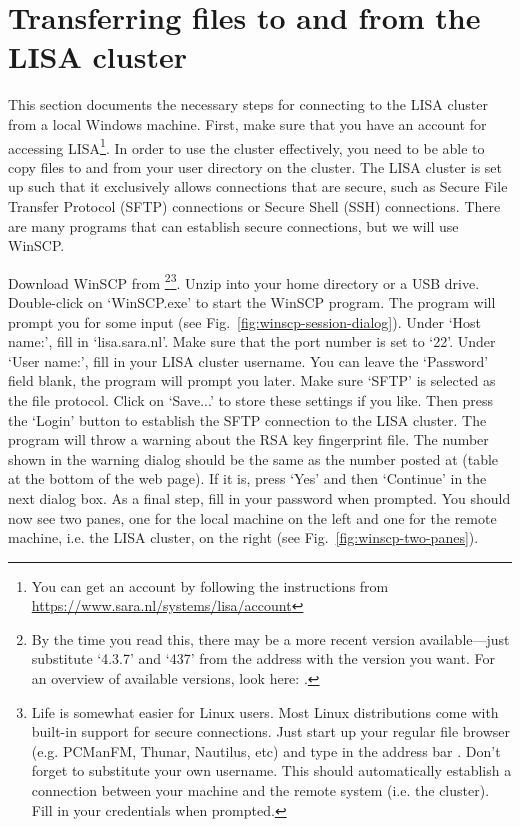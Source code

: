 \section{Transferring files to and from the LISA cluster}

This section documents the necessary steps for connecting to the LISA cluster from a local Windows machine. First, make sure that you have an account for accessing LISA\footnote{You can get an account by following the instructions from \url{https://www.sara.nl/systems/lisa/account}}. In order to use the cluster effectively, you need to be able to copy files to and from your user directory on the cluster. The LISA cluster is set up such that it exclusively allows connections that are secure, such as Secure File Transfer Protocol (SFTP) connections or Secure Shell (SSH) connections. There are many programs that can establish secure connections, but we will use WinSCP.

Download WinSCP from \footnote{By the time you read this, there may be a more recent version available---just substitute `4.3.7' and `437' from the address with the version you want. For an overview of available versions, look here: .}\footnote{Life is somewhat easier for Linux users. Most Linux distributions come with built-in support for secure connections. Just start up your regular file browser (e.g. PCManFM, Thunar, Nautilus, etc) and type in the address bar . Don't forget to substitute your own username. This should automatically establish a connection between your machine and the remote system (i.e. the cluster). Fill in your credentials when prompted.}. Unzip into your home directory or a USB drive. Double-click on `WinSCP.exe' to start the WinSCP program. The program will prompt you for some input (see Fig.~\ref{fig:winscp-session-dialog}). Under `Host name:', fill in `lisa.sara.nl'. Make sure that the port number is set to `22'. Under `User name:', fill in your LISA cluster username. You can leave the `Password' field blank, the program will prompt you later. Make sure `SFTP' is selected as the file protocol. Click on `Save...' to store these settings if you like. Then press the `Login' button to establish the SFTP connection to the LISA cluster. The program will throw a warning about the RSA key fingerprint file. The number shown in the warning dialog should be the same as the number posted at  (table at the bottom of the web page). If it is, press `Yes' and then `Continue' in the next dialog box. As a final step, fill in your password when prompted. You should now see two panes, one for the local machine on the left and one for the remote machine, i.e. the LISA cluster, on the right (see Fig.~\ref{fig:winscp-two-panes}).

